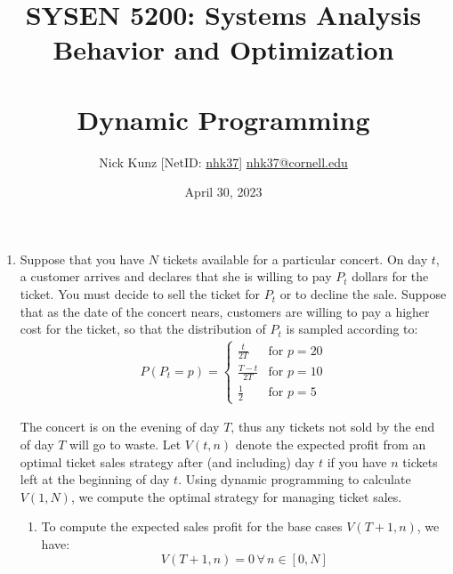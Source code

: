 \documentclass{article}
\begin{document}
\title{SYSEN 5200: Systems Analysis Behavior and Optimization\\~\\
    \Large Dynamic Programming
}
\author{
    Nick Kunz [NetID: \url{nhk37}] \hyperlink{nhk37@cornell.edu}{nhk37@cornell.edu}}
\date{April 30, 2023}
\maketitle
\thispagestyle{fancy}

\begin{enumerate}

    \item Suppose that you have $N$ tickets available for a particular concert. On day $t$, a customer arrives and declares that she is willing to pay $P_t$ dollars for the ticket. You must decide to sell the ticket for $P_t$ or to decline the sale. Suppose that as the date of the concert nears, customers are willing to pay a higher cost for the ticket, so that the distribution of $P_t$ is sampled according to:
    \begin{equation}
        \begin{split}
            P(P_t = p) =
            \begin{cases}
                \frac{t}{2T} & \text{for } p = 20\\
                \frac{T - t}{2T} & \text{for } p = 10\\
                \frac{1}{2} & \text{for } p = 5
            \end{cases}
        \end{split}
    \end{equation}

    The concert is on the evening of day $T$, thus any tickets not sold by the end of day $T$ will go to waste. Let $V(t, n)$ denote the expected profit from an optimal ticket sales strategy after (and including) day $t$ if you have $n$ tickets left at the beginning of day $t$. Using dynamic programming to calculate $V(1,N)$, we compute the optimal strategy for managing ticket sales.\\

    \begin{enumerate}
        \item To compute the expected sales profit for the base cases $V(T+1,n)$, we have:
        \begin{equation}
            V(T+1, n) = 0 \, \forall \, n\in[0, N]
        \end{equation}
        

\end{enumerate}
\end{enumerate}
\end{document}
